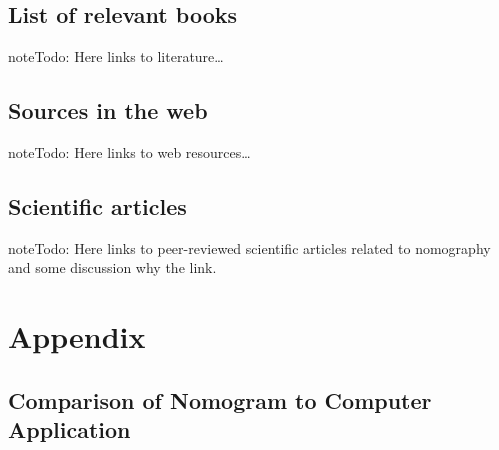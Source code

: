 \documentclass[a4paper,11pt,english]{sphinxmanual}
\begin{document}
\section{List of relevant books}
\label{\detokenize{literature/literature:list-of-relevant-books}}
\begin{sphinxadmonition}{note}{\label{literature/literature:index-0}Todo:}
Here links to literature…
\end{sphinxadmonition}


\section{Sources in the web}
\label{\detokenize{literature/literature:sources-in-the-web}}
\begin{sphinxadmonition}{note}{\label{literature/literature:index-1}Todo:}
Here links to web resources…
\end{sphinxadmonition}


\section{Scientific articles}
\label{\detokenize{literature/literature:scientific-articles}}
\begin{sphinxadmonition}{note}{\label{literature/literature:index-2}Todo:}
Here links to peer-reviewed scientific articles related to nomography and some discussion why the link.
\end{sphinxadmonition}


\chapter{Appendix}
\label{\detokenize{appendix/appendices:appendix}}\label{\detokenize{appendix/appendices::doc}}

\section{Comparison of Nomogram to Computer Application}
\label{\detokenize{appendix/appendices:comparison-of-nomogram-to-computer-application}}
\end{document}
